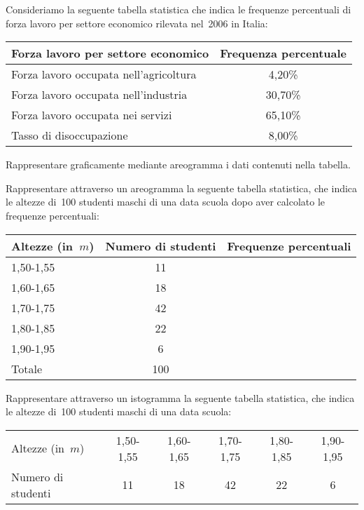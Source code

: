 \begin{esercizio}
\label{ese:A.17}
Consideriamo la seguente tabella statistica che indica le frequenze 
percentuali di forza lavoro per settore economico rilevata nel~2006 in 
Italia:
\begin{center}
\begin{tabular}{lc}
\toprule
Forza lavoro per settore economico & Frequenza percentuale\\
\midrule
Forza lavoro occupata nell'agricoltura & 4,20\%\\
Forza lavoro occupata nell'industria & 30,70\%\\
Forza lavoro occupata nei servizi & 65,10\%\\
Tasso di disoccupazione & 8,00\%\\
\bottomrule
\end{tabular}
\end{center}
Rappresentare graficamente mediante areogramma i dati contenuti nella 
tabella.
\end{esercizio}

\begin{esercizio}
\label{ese:A.18}
Rappresentare attraverso un areogramma la seguente tabella statistica, che 
indica le altezze di~100 studenti maschi
di una data scuola dopo aver calcolato le frequenze percentuali:
\begin{center}
\begin{tabular}{l*{2}{c}}
\toprule
Altezze (in~$\unit{m}$) & Numero di studenti & Frequenze percentuali\\
\midrule
1,50-1,55 & 11 & \\
1,60-1,65 & 18 & \\
1,70-1,75 & 42 & \\
1,80-1,85 & 22 & \\
1,90-1,95 & 6 & \\
\midrule
Totale & 100 & \\
\bottomrule
\end{tabular}
\end{center}

\end{esercizio}

\begin{esercizio}
\label{ese:A.19}
Rappresentare attraverso un istogramma la seguente tabella statistica, che 
indica le altezze di~100 studenti maschi di una data scuola:
\begin{center}
\begin{tabular}{l*{5}{c}}
\toprule
Altezze (in~$\unit{m}$) & 1,50-1,55 & 1,60-1,65 & 1,70-1,75 & 1,80-1,85 & 
1,90-1,95\\
Numero di studenti & 11 & 18 & 42 & 22 & 6 \\
\bottomrule
\end{tabular}
\end{center}
\end{esercizio}

